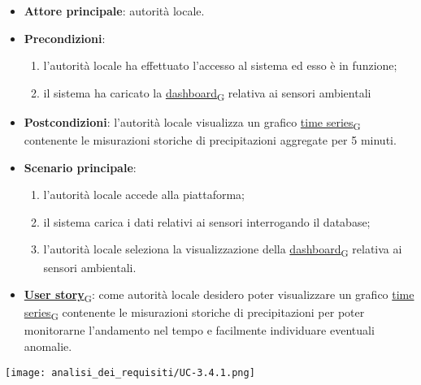 \begin{itemize}
	\item \textbf{Attore principale}: autorità locale.
	\item \textbf{Precondizioni}:
	      \begin{enumerate}
		      \item l'autorità locale ha effettuato l'accesso al sistema ed esso è in funzione;
		      \item il sistema ha caricato la \href{https://7last.github.io/docs/pb/documentazione-interna/glossario\#dashboard}{dashboard\textsubscript{G}} relativa ai sensori ambientali
	      \end{enumerate}
	\item \textbf{Postcondizioni}: l'autorità locale visualizza un grafico \href{https://7last.github.io/docs/pb/documentazione-interna/glossario\#time-series}{time series\textsubscript{G}} contenente le misurazioni storiche
	      di precipitazioni aggregate per 5 minuti.
	\item \textbf{Scenario principale}:
	      \begin{enumerate}
		      \item l'autorità locale accede alla piattaforma;
		      \item il sistema carica i dati relativi ai sensori interrogando il database;
		      \item l'autorità locale seleziona la visualizzazione della \href{https://7last.github.io/docs/pb/documentazione-interna/glossario\#dashboard}{dashboard\textsubscript{G}} relativa ai sensori ambientali.
	      \end{enumerate}
	\item \href{https://7last.github.io/docs/pb/documentazione-interna/glossario\#user-story}{\textbf{User story}\textsubscript{G}}:
	      come autorità locale desidero poter visualizzare un grafico \href{https://7last.github.io/docs/pb/documentazione-interna/glossario\#time-series}{time series\textsubscript{G}} contenente le misurazioni storiche
	      di precipitazioni per poter monitorarne l'andamento nel tempo e facilmente individuare eventuali anomalie.
\end{itemize}
\begin{center}
	\texttt{[image: analisi\_dei\_requisiti/UC-3.4.1.png]}
\end{center}


